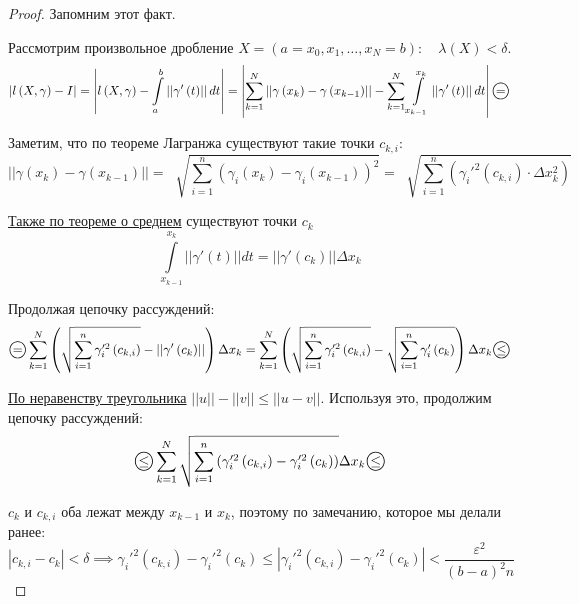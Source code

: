 \documentclass[../main.tex]{subfiles}
\begin{document}
\begin{proof}
    Запомним этот факт. 

    Рассмотрим произвольное дробление \( X=(a=x_0, x_1, \ldots , x_N=b):\quad \lambda \left( X\right)< \delta \). 
    \[ \left| l \left( X, \gamma \right)- I\right|=\left| l \left( X, \gamma \right)- \displaystyle\int\limits_{ a}^{ b} \left| \left| \gamma '\left( t\right)\right|\right|dt\right|=\left| \sum\limits_{ k=1}^{ N} \left| \left| \gamma \left( x_k\right)- \gamma \left( x_{k-1}\right)\right|\right|- \sum\limits_{ k=1}^{ N} \displaystyle\int\limits_{ x_{k-1}}^{ x_k} \left| \left| \gamma '\left( t\right)\right|\right|dt\right|\oeq\]

    Заметим, что по теореме Лагранжа существуют такие точки \( c_{k,i}\):
    \[ \left| \left| \gamma \left( x_k\right)- \gamma \left( x_{k-1}\right)\right|\right|= \;\sqrt[]{ \sum\limits_{ i=1}^{ n} \left( \gamma _i\left( x_k\right)- \gamma _i\left( x_{k-1}\right)\right)^2}= \;\sqrt[]{ \sum\limits_{ i=1}^{ n} \left( \gamma _i'^2 \left( c_{k,i}\right) \cdot \Delta x_k^2\right)}\]

    \hyperlink{thm:simple_average}{Также по теореме о среднем} существуют точки \( c_k\)
    \[ \displaystyle\int\limits_{ x_{k-1}}^{ x_k} \left| \left| \gamma '\left( t\right)\right|\right|dt=\left| \left| \gamma '\left( c_k\right)\right|\right| \Delta x_k\]

    Продолжая цепочку рассуждений:
    \begin{equation*}
        \begin{aligned}
            \oeq \sum\limits_{ k=1}^{ N} \left( \;\sqrt[]{ \sum\limits_{ i=1}^{ n} \gamma _i'^2\left( c_{k,i}\right)}-\left| \left| \gamma '\left( c_k\right)\right|\right|\right) \Delta x_k = \sum\limits_{ k=1}^{ N} \left( \;\sqrt[]{ \sum\limits_{ i=1}^{ n} \gamma _i'^2\left( c_{k,i}\right)}- \;\sqrt[]{ \sum\limits_{ i=1}^{ n} \gamma _i'\left( c_k\right)}\right) \Delta x_k \oleq
        \end{aligned}
    \end{equation*}

    \hyperlink{thm:minkovsky}{По неравенству треугольника} \( \left| \left| u\right|\right|-\left| \left| v\right|\right| \leq \left| \left| u-v\right|\right|\). Используя это, продолжим цепочку рассуждений: 
    \[ \oleq \sum\limits_{ k=1}^{ N} \;\sqrt[]{ \sum\limits_{ i=1}^{ n} \left( \gamma _i'^2\left( c_{k,i}\right)- \gamma _i'^2\left( c_k\right)\right)} \Delta x_k \oleq\]

    \( c_k\) и \( c_{k, i}\) оба лежат между \( x_{k-1}\) и \( x_k\), поэтому по замечанию, которое мы делали ранее:
    \[ \left| c_{k,i}-c_k\right| < \delta \implies \gamma _i'^2\left( c_{k,i}\right)- \gamma _i'^2\left( c_k\right) \leq \left|\gamma _i'^2\left( c_{k,i}\right)- \gamma _i'^2\left( c_k\right) \right| < \dfrac{ \varepsilon^2}{ \left( b-a\right)^2n} \]


\end{proof}
\end{document}
